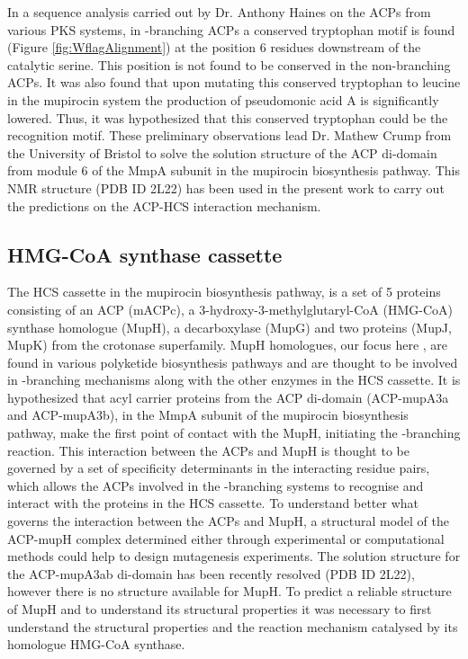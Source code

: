 In a sequence analysis carried out by Dr. Anthony Haines on the ACPs from various PKS systems, in \bet-branching ACPs a conserved tryptophan motif is found (Figure \ref{fig:WflagAlignment}) at the position 6 residues downstream of the catalytic serine. This position is not found to be conserved in the non-branching ACPs. It was also found that upon mutating this conserved tryptophan to leucine in the mupirocin system the production of pseudomonic acid A is significantly lowered. Thus, it was hypothesized that this conserved tryptophan could be the recognition motif. These preliminary observations lead Dr. Mathew Crump from the University of Bristol to solve the solution structure of the ACP di-domain from module 6 of the MmpA subunit in the mupirocin biosynthesis pathway. This NMR structure (PDB ID 2L22) has been used in the present work to carry out the predictions on the ACP-HCS interaction mechanism.

	\subsection{HMG-CoA synthase cassette}
	\label{sec:HMG-Coasynthase}
	The HCS cassette in the mupirocin biosynthesis pathway, is a set of 5 proteins consisting of an ACP (mACPc), a 3-hydroxy-3-methylglutaryl-CoA (HMG-CoA) synthase homologue (MupH), a decarboxylase (MupG) and two proteins (MupJ, MupK) from the crotonase superfamily. MupH homologues, our focus here \parencite{Wu2007}, are found in various polyketide biosynthesis pathways and are thought to be involved in \bet-branching mechanisms along with the other enzymes in the HCS cassette. It is hypothesized that acyl carrier proteins from the ACP di-domain (ACP-mupA3a and ACP-mupA3b), in the MmpA subunit of the mupirocin biosynthesis pathway, make the first point of contact with the MupH, initiating the \bet-branching reaction. This interaction between the ACPs and MupH is thought to be governed by a set of specificity determinants in the interacting residue pairs, which allows the ACPs involved in the \bet-branching systems to recognise and interact with the proteins in the HCS cassette. To understand better what governs the interaction between the ACPs and MupH, a structural model of the ACP-mupH complex determined either through experimental or computational methods could help to design mutagenesis experiments. The solution structure for the ACP-mupA3ab di-domain has been recently resolved (PDB ID 2L22), however there is no structure available for MupH. To predict a reliable structure of MupH and to understand its structural properties it was necessary to first understand the structural properties and the reaction mechanism catalysed by its homologue HMG-CoA synthase.

